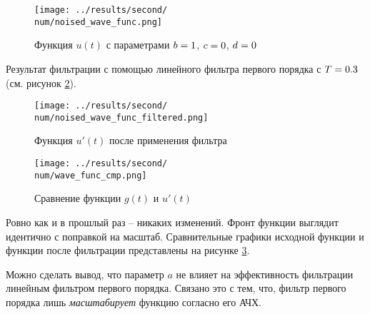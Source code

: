 \begin{figure}[ht!]
    \centering
    \texttt{[image: ../results/second/\\num/noised\_wave\_func.png]}
    \caption{Функция $u(t)$ с параметрами $b = 1$, $c = 0$, $d = 0$}
    \label{fig:noised_wave_func_\num}
\end{figure}

Результат фильтрации с помощью линейного фильтра первого порядка с $T = 0.3$ (см. рисунок \ref{fig:noised_wave_func_filtered_\num}).

\begin{figure}[ht!]
    \centering
    \texttt{[image: ../results/second/\\num/noised\_wave\_func\_filtered.png]}
    \caption{Функция $u'(t)$ после применения фильтра}
    \label{fig:noised_wave_func_filtered_\num}
\end{figure}

\begin{figure}[ht!]
    \centering
    \texttt{[image: ../results/second/\\num/wave\_func\_cmp.png]}
    \caption{Сравнение функции $g(t)$ и $u'(t)$}
    \label{fig:wave_func_cmp_\num}
\end{figure}

Ровно как и в прошлый раз -- никаких изменений. Фронт функции выглядит идентично с поправкой на масштаб.
Сравнительные графики исходной функции и функции после фильтрации представлены на рисунке \ref{fig:wave_func_cmp_\num}.

Можно сделать вывод, что параметр $a$ не влияет на эффективность фильтрации линейным фильтром первого порядка. 
Связано это с тем, что, фильтр первого порядка лишь \textit{масштабирует} функцию согласно его АЧХ. 
